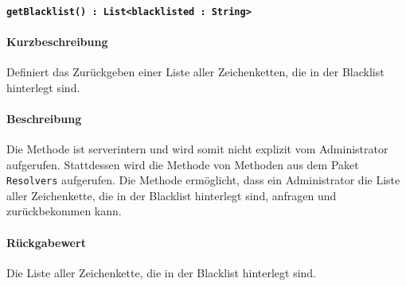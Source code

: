 \paragraph{\texttt{getBlacklist() : List<blacklisted : String>}}%
\paragraph*{Kurzbeschreibung}
Definiert das Zurückgeben einer Liste aller Zeichenketten, die in der Blacklist hinterlegt sind.
\paragraph*{Beschreibung}
Die Methode ist serverintern und wird somit nicht explizit vom Administrator aufgerufen.
Stattdessen wird die Methode von Methoden aus dem Paket \texttt{Resolvers} aufgerufen.
Die Methode ermöglicht, dass ein Administrator die Liste aller Zeichenkette, die in der Blacklist hinterlegt sind, anfragen und zurückbekommen kann.
\paragraph*{Rückgabewert}
Die Liste aller Zeichenkette, die in der Blacklist hinterlegt sind.
